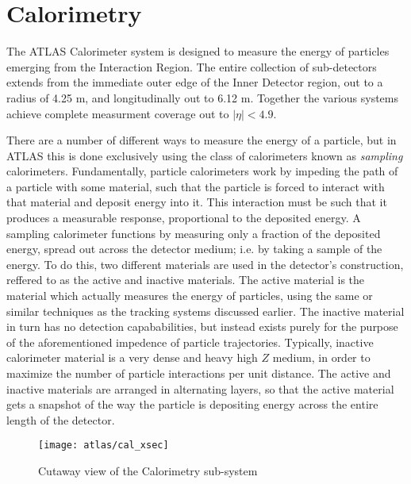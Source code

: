 \section{Calorimetry} \label{sec:calorimeter}
    The ATLAS Calorimeter system is designed to measure the energy of particles emerging from the Interaction Region.
    The entire collection of sub-detectors extends from the immediate outer edge of the Inner Detector region, out to a radius of 4.25 m, and longitudinally out to 6.12 m.
    Together the various systems achieve complete measurment coverage out to $|\eta| < 4.9$.

    There are a number of different ways to measure the energy of a particle, but in ATLAS this is done exclusively using the class of calorimeters known as \textit{sampling} calorimeters.
    Fundamentally, particle calorimeters work by impeding the path of a particle with some material, such that the particle is forced to interact with that material and deposit energy into it.
    This interaction must be such that it produces a measurable response, proportional to the deposited energy.
    A sampling calorimeter functions by measuring only a fraction of the deposited energy, spread out across the detector medium; i.e. by taking a sample of the energy.
    To do this, two different materials are used in the detector's construction, reffered to as the active and inactive materials.
    The active material is the material which actually measures the energy of particles, using the same or similar techniques as the tracking systems discussed earlier.
    The inactive material in turn has no detection capababilities, but instead exists purely for the purpose of the aforementioned impedence of particle trajectories.
    Typically, inactive calorimeter material is a very dense and heavy high $Z$ medium, in order to maximize the number of particle interactions per unit distance.
    The active and inactive materials are arranged in alternating layers, so that the active material gets a snapshot of the way the particle is depositing energy across the entire length of the detector.\cite{energy_measurement}

    \begin{figure}
        \texttt{[image: atlas/cal\_xsec]}
        \caption{Cutaway view of the Calorimetry sub-system \cite{atlas_tdr}}
        \label{fig:cal_xsec}
    \end{figure}

